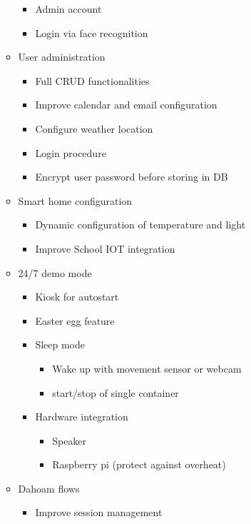 \documentclass[12pt]{article}
\theoremstyle{definition}
\begin{document}
\begin{itemize}
\begin{itemize}
\begin{itemize}
            \item Admin account
            \item Login via face recognition
        \end{itemize}
        \item User administration
        \begin{itemize}
            \item Full CRUD functionalities
            \item Improve calendar and email configuration
            \item Configure weather location
            \item Login procedure
            \item Encrypt user password before storing in DB
        \end{itemize}
        \item Smart home configuration
        \begin{itemize}
            \item Dynamic configuration of temperature and light
            \item Improve School IOT integration
        \end{itemize}
        \item 24/7 demo mode
        \begin{itemize}
            \item Kiosk for autostart
            \item Easter egg feature
            \item Sleep mode
            \begin{itemize}
                \item Wake up with movement sensor or webcam
                \item start/stop of single container
            \end{itemize}
            \item Hardware integration
            \begin{itemize}
                \item Speaker
                \item Raspberry pi (protect against overheat)
            \end{itemize}
        \end{itemize}
        \item Dahoam flows
        \begin{itemize}
            \item Improve session management

\end{itemize}
\end{itemize}
\end{itemize}
\end{document}
